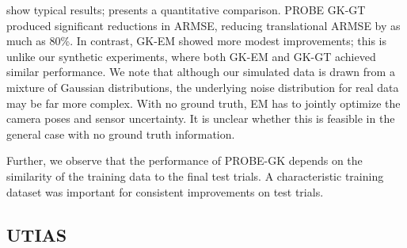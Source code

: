  show
typical results;  presents a quantitative comparison.
PROBE GK-GT produced significant reductions in ARMSE, reducing translational ARMSE by
as much as 80\%. In contrast, GK-EM showed more modest improvements; this is
unlike our synthetic experiments, where both GK-EM and GK-GT achieved similar
performance. We note that although our simulated
data is drawn from a mixture of Gaussian distributions, the underlying
noise distribution for real data may be far more complex. With no ground truth, EM has to jointly optimize the camera poses and sensor uncertainty. It is unclear whether this is feasible in the general case with no ground truth information.

Further, we observe that the performance of PROBE-GK depends on the similarity
of the training data to the final test trials. A characteristic training dataset was important for consistent improvements on test trials.


\subsection{UTIAS}

\begin{table}
\centering
\caption{Comparison of average root mean squared errors (ARMSE) for rotational
  and translational components. Each trial is trained and tested from a
  particular category of raw data from the synthetic and KITTI datasets.}

\end{table}

